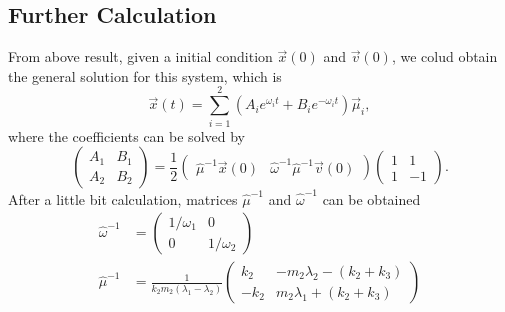 \documentclass[12pt]{article}%
\begin{document}
	\subsection{Further Calculation}
	From above result, given a initial condition $\vec{x}\left(0\right)$ and $\vec{v}\left(0\right)$, we colud obtain the general solution for this system, which is 
	\begin{equation}
	\vec{x}\left(t\right) = \sum_{i=1}^{2}\left(A_{i}e^{\omega_i t}+ B_{i}e^{-\omega_i t}\right)\vec{\mu}_i,
	\end{equation}
	where the coefficients can be solved by
	\begin{equation}
	\begin{pmatrix}A_{1}&B_{1}\\A_{2}&B_{2}\end{pmatrix} = 
	\frac{1}{2}
	\begin{pmatrix}
		\hat{\mu}^{-1}\vec{x}\left(0\right) & 
		\hat{\omega}^{-1}\hat{\mu}^{-1}\vec{v}\left(0\right)
	\end{pmatrix}\begin{pmatrix}1&1\\ 1&-1\end{pmatrix}.
	\end{equation}
	After a little bit calculation, matrices $\hat{\mu}^{-1}$ and $\hat{\omega}^{-1}$ can be obtained
	\begin{equation}
	\begin{aligned}
	\hat{\omega}^{-1} &= \begin{pmatrix}1/\omega_1&0\\ 0&1/\omega_2\end{pmatrix}
	\\
	\hat{\mu}^{-1} &= \frac{1}{k_2m_2\left(\lambda_1-\lambda_2\right)} 
	\begin{pmatrix}
		k_2&-m_2 \lambda_2- \left(k_2+k_3\right)\\
		-k_2&m_2 \lambda_1+ \left(k_2+k_3\right)
	\end{pmatrix}
	\end{aligned}
	\end{equation}


	


	




	

	

	 

	 
	 
	 
	 
	 
	 
\end{document}
